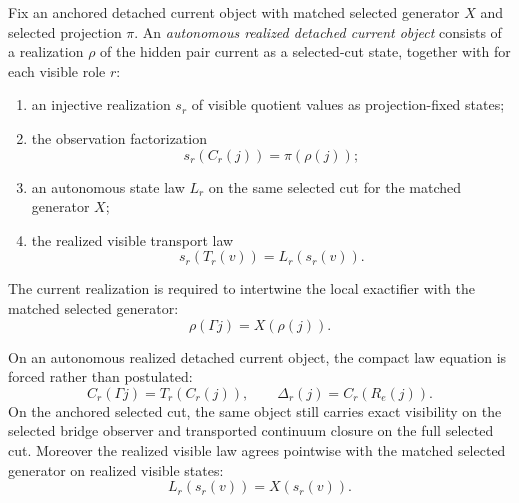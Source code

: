 \begin{definition}
\label{def:autonomous-realized-detached-current-object}
Fix an anchored detached current object with matched selected generator \(X\)
and selected projection \(\pi\). An \emph{autonomous realized detached current
object} consists of a realization \(\rho\) of the hidden pair current as a
selected-cut state, together with for each visible role \(r\):
\begin{enumerate}
\item an injective realization \(s_r\) of visible quotient values as
projection-fixed states;
\item the observation factorization
\[
s_r(C_r(j))=\pi(\rho(j));
\]
\item an autonomous state law \(L_r\) on the same selected cut for the matched
generator \(X\);
\item the realized visible transport law
\[
s_r(T_r(v))=L_r(s_r(v)).
\]
\end{enumerate}
The current realization is required to intertwine the local exactifier with the
matched selected generator:
\[
\rho(\Gamma j)=X(\rho(j)).
\]
\end{definition}

\begin{theorem}
\label{thm:autonomy-forces-the-detached-flagship-equation}
On an autonomous realized detached current object, the compact law equation is
forced rather than postulated:
\[
C_r(\Gamma j)=T_r(C_r(j)),
\qquad
\Delta_r(j)=C_r(R_e(j)).
\]
On the anchored selected cut, the same object still carries exact visibility on
the selected bridge observer and transported continuum closure on the full
selected cut. Moreover the realized visible law agrees pointwise with the
matched selected generator on realized visible states:
\[
L_r(s_r(v))=X(s_r(v)).
\]
\end{theorem}

